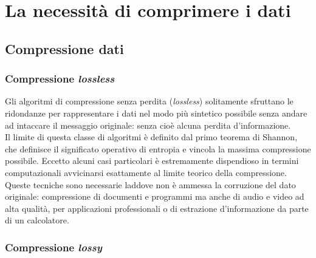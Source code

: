 
\chapter{La necessità di comprimere i dati} %

\label{Chapter3}



\section{Compressione dati}

\subsection{Compressione \emph{lossless}}

Gli algoritmi di compressione senza perdita (\emph{lossless}) solitamente 
sfruttano le ridondanze per rappresentare i dati nel modo più sintetico 
possibile senza andare ad intaccare il messaggio originale: senza cioè alcuna 
perdita d'informazione.\\

Il limite di questa classe di algoritmi è definito dal primo teorema di 
Shannon, che definisce il significato operativo di entropia e vincola la 
massima compressione possibile.
Eccetto alcuni casi particolari è estremamente dispendioso in termini 
computazionali avvicinarsi esattamente al limite teorico della compressione.\\

Queste tecniche sono necessarie laddove non è ammessa la corruzione del dato 
originale: compressione di documenti e programmi ma anche di audio e video ad 
alta qualità, per applicazioni professionali o di estrazione d'informazione da 
parte di un calcolatore.


\subsection{Compressione \emph{lossy}}

